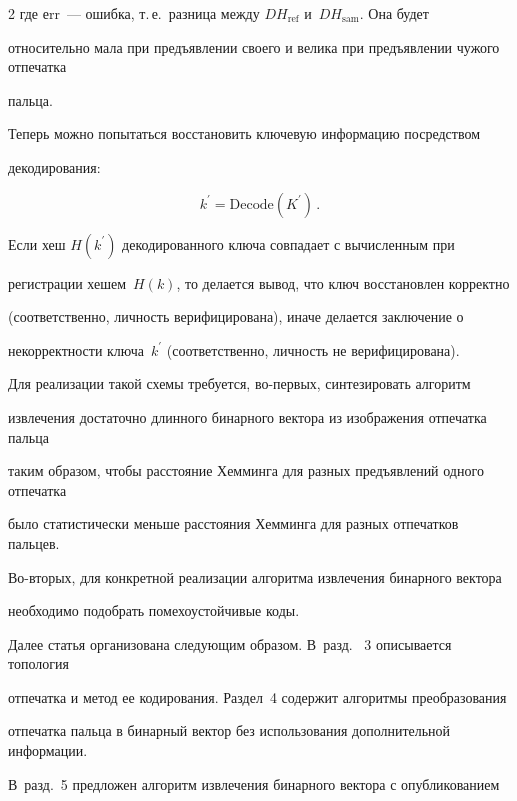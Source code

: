 \begin{multicols}{2}
где еrr~--- ошибка, т.\,е.\ разница между $DH_{\mathrm{ref}}$ и~$DH_{\mathrm{sam}}$. Она будет 

относительно мала при предъявлении своего и велика при предъявлении чужого отпечатка 

пальца.

      

      Теперь можно попытаться восстановить ключевую информацию посредством 

декодирования:

      \begin{equation*}

      k^\prime= \mathrm{Decode}\left( K^\prime\right)\,.


      \end{equation*}

      

      Если хеш $H(k^\prime)$ декодированного ключа совпадает с вычисленным при 

регистрации хешем~$H(k)$, то делается вывод, что ключ восстановлен корректно 

(соответственно, личность верифицирована), иначе делается заключение о 

некорректности ключа~$k^\prime$ (соответственно, личность не верифицирована). 

      

      Для реализации такой схемы требуется, во-пер\-вых, синтезировать алгоритм 

извлечения достаточно длинного бинарного вектора из изображения отпечатка пальца 

таким образом, чтобы расстояние Хемминга для разных предъявлений одного отпечатка 

было статистически меньше расстояния Хемминга для разных отпечатков пальцев. 

      Во-вто\-рых, для конкретной реализации алгоритма извлечения бинарного вектора 

необходимо подобрать помехоустойчивые коды.

     

      Далее статья организована следующим образом. В~разд.~ 3 описывается топология 

отпечатка и метод ее кодирования. Раздел~4 содержит алгоритмы преобразования 

отпечатка пальца в бинарный вектор без использования дополнительной информации. 

В~разд.~5 предложен алгоритм извлечения бинарного вектора с опубликованием 


\end{multicols}
